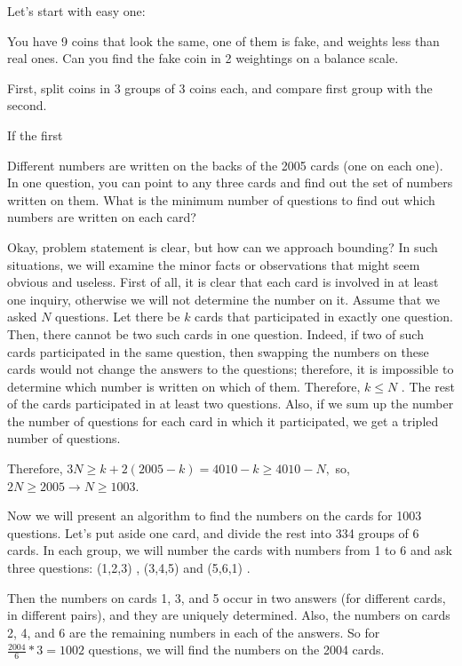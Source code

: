 Let's start with easy one:

\begin{example}
    You have 9 coins that look the same, one of them is fake, and weights less than real ones. Can you find the fake coin in 2 weightings on a balance scale.
\end{example}

First, split coins in 3 groups of 3 coins each, and compare first group with the second.

If the first 

\begin{example} [Russia 2005]
    Different numbers are written on the backs of the 2005 cards (one on each one). In one question, you can point to any three cards and find out the set of numbers written on them. What is the minimum number of questions to find out which numbers are written on each card?
\end{example}

\sol Okay, problem statement is clear, but how can we approach bounding? In such situations, we will examine the minor facts or observations that might seem obvious and useless. First of all, it is clear that each card is involved in at least one inquiry, otherwise we will not determine the number on it. Assume that we asked $N$ questions. Let there be $k$ cards that participated in exactly one question. Then, there cannot be two such cards in one question. Indeed, if two of such cards participated in the same question, then swapping the numbers on these cards would not change the answers to the questions; therefore, it is impossible to determine which number is written on which of them. Therefore, $k\leq N$ . The rest of the cards participated in at least two questions. Also, if we sum up the number the number of questions for each card in which it participated, we get a tripled number of questions.

Therefore, $3N \geq k + 2(2005-k) = 4010-k \geq 4010-N ,$ so, $2N \geq 2005 \rightarrow  N\geq 1003$. 

Now we will present an algorithm to find the numbers on the cards for 1003 questions. Let's put aside one card, and divide the rest into 334 groups of 6 cards. In each group, we will number the cards with numbers from 1 to 6 and ask three questions: (1,2,3) , (3,4,5) and (5,6,1) .

Then the numbers on cards 1, 3, and 5 occur in two answers (for different cards, in different pairs), and they are uniquely determined. Also, the numbers on cards 2, 4, and 6 are the remaining numbers in each of the answers. So for $\frac{2004}{6} * 3 = 1002$ questions, we will find the numbers on the 2004 cards.

